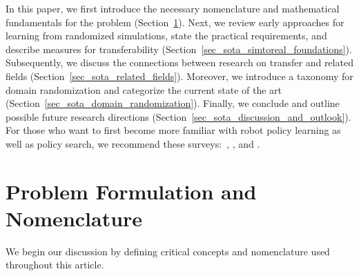 \documentclass[utf8]{frontiersSCNS} %
\begin{document}
In this paper, we first introduce the necessary nomenclature and mathematical fundamentals for the problem (Section~\ref{sec_sota_mdp}).
Next, we review early approaches for learning from randomized simulations, state the practical requirements, and describe measures for \simtoreal transferability (Section~\ref{sec_sota_simtoreal_foundations}).
Subsequently, we discuss the connections between research on \simtoreal transfer and related fields (Section~\ref{sec_sota_related_fields}).
Moreover, we introduce a taxonomy for domain randomization and categorize the current state of the art (Section~\ref{sec_sota_domain_randomization}).
Finally, we conclude and outline possible future research directions (Section~\ref{sec_sota_discussion_and_outlook}). For those who want to first become more familiar with robot policy learning as well as policy search, we recommend these surveys:~\citet{Kober_Peters_13}, \citet{Deisenroth_Peters_13}, and \citet{Chatzilygeroudis_Mouret_20}.


\section{Problem Formulation and Nomenclature}
\label{sec_sota_mdp}
We begin our discussion by defining critical concepts and nomenclature used throughout this article. 
\end{document}
